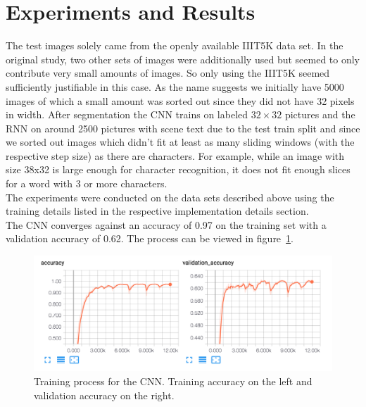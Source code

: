 \documentclass{utue} %
\begin{document}
\section{Experiments and Results}
The test images solely came from the openly available IIIT5K data set. In the original study, two other sets of images were additionally used but seemed to only contribute very small amounts of images. So only using the IIIT5K seemed sufficiently justifiable in this case. As the name suggests we initially have 5000 images of which a small amount was sorted out since they did not have 32 pixels in width. After segmentation the CNN trains on %
labeled $32\times32$ pictures and the RNN on around 2500 pictures with scene text due to the test train split and since we sorted out images which didn't fit at least as many sliding windows (with the respective step size) as there are characters. For example, while an image with size 38x32 is large enough for character recognition, it does not fit enough slices for a word with 3 or more characters.\\
The experiments were conducted on the data sets described above using the training details listed in the respective implementation details section. \\
The CNN converges against an accuracy of 0.97 on the training set with a validation accuracy of 0.62. The process can be viewed in figure~\ref{fig:cnn_accuracy}.\\

\begin{figure}[h!]
	\centering
	\includegraphics[width=\columnwidth]{graphics/cnn_accuracy.png}
	\caption{\label{fig:cnn_accuracy}Training process for the CNN. Training accuracy on the left and validation accuracy on the right.}
\end{figure}
\end{document}
